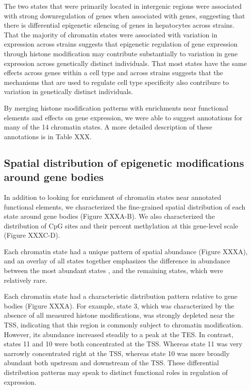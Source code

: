 \documentclass[10pt,letterpaper]{article}
\begin{document}
The two states that were primarily located in intergenic regions were
associated with strong downregulation of genes when associated with
genes, suggesting that there is differential epigenetic silencing of
genes in hepatocytes across strains. That the majority of chromatin
states were associated with variation in expression across strains
suggests that epigenetic regulation of gene expression through histone
modification may contribute substantially to variation in gene
expression across genetically distinct individuals. That most states
have the same effects across genes within a cell type and across strains
suggests that the mechanisms that are used to regulate cell type
specificity also contribure to variation in genetically distinct
individuals.

By merging histone modification patterns with enrichments near
functional elements and effects on gene expression, we were able to
suggest annotations for many of the 14 chromatin states. A more detailed
description of these annotations is in Table XXX.

\hypertarget{spatial-distribution-of-epigenetic-modifications-around-gene-bodies}{%
\subsection{Spatial distribution of epigenetic modifications around gene
bodies}\label{spatial-distribution-of-epigenetic-modifications-around-gene-bodies}}

In addition to looking for enrichment of chromatin states near annotated
functional elements, we characterized the fine-grained spatial
distribution of each state around gene bodies (Figure XXXA-B). We also
characterized the distribution of CpG sites and their percent
methylation at this gene-level scale (Figure XXXC-D).

Each chromatin state had a unique pattern of spatial abundance (Figure
XXXA), and an overlay of all states together emphasizes the difference
in abundance between the most abundant states , and the remaining
states, which were relatively rare.

Each chromatin state had a characteristic distribution pattern relative
to gene bodies (Figure XXXA). For example, state 3, which was
characterized by the absence of all measured histone modifications, was
strongly depleted near the TSS, indicating that this region is commonly
subject to chromatin modification. However, its abundance increased
steadily to a peak at the TES. In contrast, states 11 and 10 were both
concentrated at the TSS. Whereas state 11 was very narrowly concentrated
right at the TSS, whereas state 10 was more broadly abundant both
upstream and downstream of the TSS. These differential distribution
patterns may speak to distinct functional roles in regulation of
expression.
\end{document}
